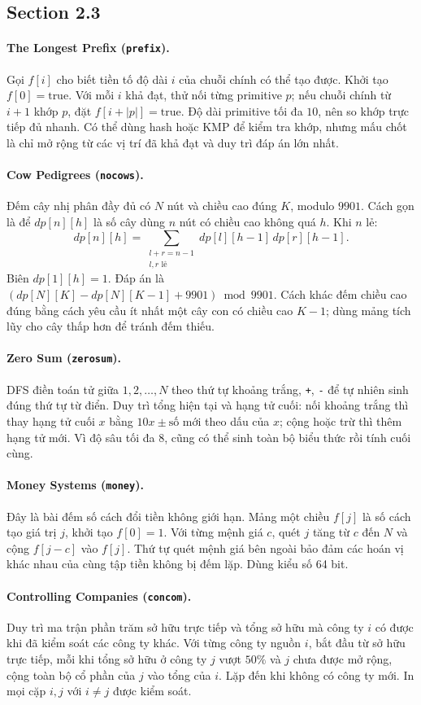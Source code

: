 \documentclass[11pt]{article}
\newcommand{\problem}[2]{\paragraph{#1 (\texttt{#2}).}}
\begin{document}
\subsection*{Section 2.3}

\problem{The Longest Prefix}{prefix}
Gọi \(f[i]\) cho biết tiền tố độ dài \(i\) của chuỗi chính có thể tạo được. Khởi tạo \(f[0]=\text{true}\). Với mỗi \(i\) khả đạt, thử nối từng primitive \(p\); nếu chuỗi chính từ \(i+1\) khớp \(p\), đặt \(f[i+|p|]=\text{true}\). Độ dài primitive tối đa \(10\), nên so khớp trực tiếp đủ nhanh. Có thể dùng hash hoặc KMP để kiểm tra khớp, nhưng mấu chốt là chỉ mở rộng từ các vị trí đã khả đạt và duy trì đáp án lớn nhất.

\problem{Cow Pedigrees}{nocows}
Đếm cây nhị phân đầy đủ có \(N\) nút và chiều cao đúng \(K\), modulo \(9901\). Cách gọn là để \(dp[n][h]\) là số cây dùng \(n\) nút có chiều cao không quá \(h\). Khi \(n\) lẻ:
\[
  dp[n][h]=\sum_{\substack{l+r=n-1\\l,r\text{ lẻ}}} dp[l][h-1]\,dp[r][h-1].
\]
Biên \(dp[1][h]=1\). Đáp án là \((dp[N][K]-dp[N][K-1]+9901)\bmod 9901\). Cách khác đếm chiều cao đúng bằng cách yêu cầu ít nhất một cây con có chiều cao \(K-1\); dùng mảng tích lũy cho cây thấp hơn để tránh đếm thiếu.

\problem{Zero Sum}{zerosum}
DFS điền toán tử giữa \(1,2,\ldots,N\) theo thứ tự khoảng trắng, \texttt{+}, \texttt{-} để tự nhiên sinh đúng thứ tự từ điển. Duy trì tổng hiện tại và hạng tử cuối: nối khoảng trắng thì thay hạng tử cuối \(x\) bằng \(10x\pm\text{số mới}\) theo dấu của \(x\); cộng hoặc trừ thì thêm hạng tử mới. Vì độ sâu tối đa \(8\), cũng có thể sinh toàn bộ biểu thức rồi tính cuối cùng.

\problem{Money Systems}{money}
Đây là bài đếm số cách đổi tiền không giới hạn. Mảng một chiều \(f[j]\) là số cách tạo giá trị \(j\), khởi tạo \(f[0]=1\). Với từng mệnh giá \(c\), quét \(j\) tăng từ \(c\) đến \(N\) và cộng \(f[j-c]\) vào \(f[j]\). Thứ tự quét mệnh giá bên ngoài bảo đảm các hoán vị khác nhau của cùng tập tiền không bị đếm lặp. Dùng kiểu số 64 bit.

\problem{Controlling Companies}{concom}
Duy trì ma trận phần trăm sở hữu trực tiếp và tổng sở hữu mà công ty \(i\) có được khi đã kiểm soát các công ty khác. Với từng công ty nguồn \(i\), bắt đầu từ sở hữu trực tiếp, mỗi khi tổng sở hữu ở công ty \(j\) vượt \(50\%\) và \(j\) chưa được mở rộng, cộng toàn bộ cổ phần của \(j\) vào tổng của \(i\). Lặp đến khi không có công ty mới. In mọi cặp \(i,j\) với \(i\ne j\) được kiểm soát.
\end{document}
